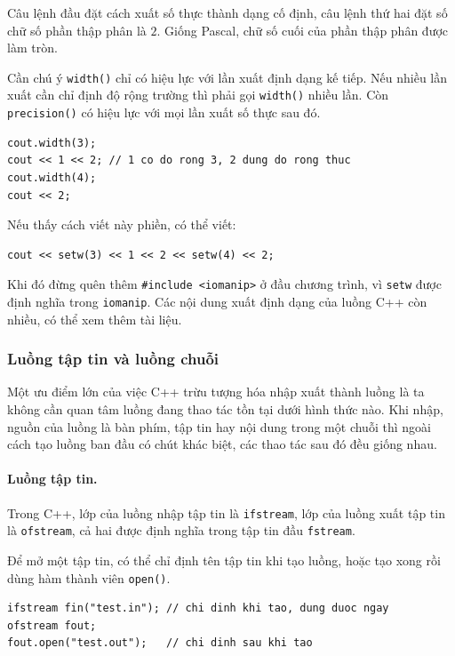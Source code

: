 \documentclass[11pt]{article}
\newcommand{\cpp}{C++}
\newcommand{\pascal}{Pascal}
\begin{document}
Câu lệnh đầu đặt cách xuất số thực thành dạng cố định, câu lệnh thứ hai đặt
số chữ số phần thập phân là \(2\). Giống \pascal{}, chữ số cuối của phần thập
phân được làm tròn.

Cần chú ý \verb|width()| chỉ có hiệu lực với lần xuất định dạng kế tiếp. Nếu
nhiều lần xuất cần chỉ định độ rộng trường thì phải gọi \verb|width()| nhiều
lần. Còn \verb|precision()| có hiệu lực với mọi lần xuất số thực sau đó.

\begin{verbatim}
cout.width(3);
cout << 1 << 2; // 1 co do rong 3, 2 dung do rong thuc
cout.width(4);
cout << 2;
\end{verbatim}

Nếu thấy cách viết này phiền, có thể viết:

\begin{verbatim}
cout << setw(3) << 1 << 2 << setw(4) << 2;
\end{verbatim}

Khi đó đừng quên thêm \verb|#include <iomanip>| ở đầu chương trình, vì
\verb|setw| được định nghĩa trong \verb|iomanip|. Các nội dung xuất định dạng
của luồng \cpp{} còn nhiều, có thể xem thêm tài liệu.

\subsubsection*{Luồng tập tin và luồng chuỗi}

Một ưu điểm lớn của việc \cpp{} trừu tượng hóa nhập xuất thành luồng là ta
không cần quan tâm luồng đang thao tác tồn tại dưới hình thức nào. Khi nhập,
nguồn của luồng là bàn phím, tập tin hay nội dung trong một chuỗi thì ngoài
cách tạo luồng ban đầu có chút khác biệt, các thao tác sau đó đều giống nhau.

\paragraph{Luồng tập tin.}
Trong \cpp{}, lớp của luồng nhập tập tin là \verb|ifstream|, lớp của luồng
xuất tập tin là \verb|ofstream|, cả hai được định nghĩa trong tập tin đầu
\verb|fstream|.

Để mở một tập tin, có thể chỉ định tên tập tin khi tạo luồng, hoặc tạo xong
rồi dùng hàm thành viên \verb|open()|.

\begin{verbatim}
ifstream fin("test.in"); // chi dinh khi tao, dung duoc ngay
ofstream fout;
fout.open("test.out");   // chi dinh sau khi tao
\end{verbatim}
\end{document}
